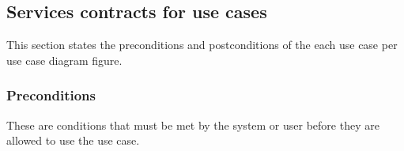 \documentclass[12pt]{article}
\begin{document}
\vspace{0.2in}
\newpage
\subsection{Services contracts for use cases} %
\vspace{0.2in}

This section states the preconditions and postconditions of the each use case per use case diagram figure. \\

\subsubsection{Preconditions}
These are conditions that must be met by the system or user before they are allowed to use the use case.\\
\end{document}
